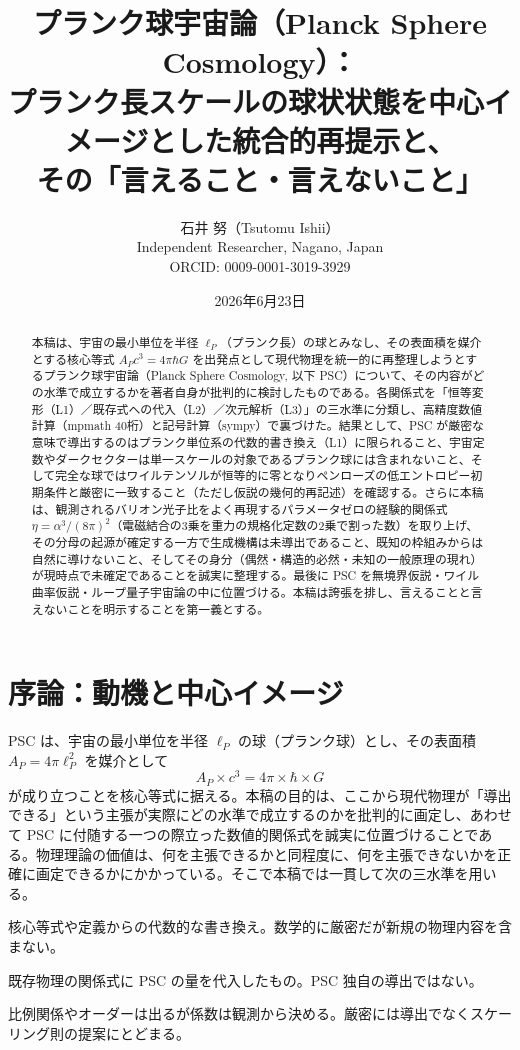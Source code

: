 \documentclass[11pt,a4paper]{article}
\title{\bfseries プランク球宇宙論（Planck Sphere Cosmology）：\\プランク長スケールの球状状態を中心イメージとした統合的再提示と、\\その「言えること・言えないこと」}
\author{石井 努（Tsutomu Ishii）\\ Independent Researcher, Nagano, Japan\\ ORCID: 0009-0001-3019-3929}
\date{2026年6月23日}
\newcommand{\eP}{\ell_P}
\begin{document}
\maketitle

\begin{abstract}
本稿は、宇宙の最小単位を半径 $\eP$（プランク長）の球とみなし、その表面積を媒介とする核心等式 $A_P c^3 = 4\pi\hbar G$ を出発点として現代物理を統一的に再整理しようとするプランク球宇宙論（Planck Sphere Cosmology, 以下 PSC）について、その内容がどの水準で成立するかを著者自身が批判的に検討したものである。各関係式を「恒等変形（L1）／既存式への代入（L2）／次元解析（L3）」の三水準に分類し、高精度数値計算（mpmath 40桁）と記号計算（sympy）で裏づけた。結果として、PSC が厳密な意味で導出するのはプランク単位系の代数的書き換え（L1）に限られること、宇宙定数やダークセクターは単一スケールの対象であるプランク球には含まれないこと、そして完全な球ではワイルテンソルが恒等的に零となりペンローズの低エントロピー初期条件と厳密に一致すること（ただし仮説の幾何的再記述）を確認する。さらに本稿は、観測されるバリオン光子比をよく再現するパラメータゼロの経験的関係式 $\eta = \alpha^3/(8\pi)^2$（電磁結合の3乗を重力の規格化定数の2乗で割った数）を取り上げ、その分母の起源が確定する一方で生成機構は未導出であること、既知の枠組みからは自然に導けないこと、そしてその身分（偶然・構造的必然・未知の一般原理の現れ）が現時点で未確定であることを誠実に整理する。最後に PSC を無境界仮説・ワイル曲率仮説・ループ量子宇宙論の中に位置づける。本稿は誇張を排し、言えることと言えないことを明示することを第一義とする。
\end{abstract}

\section{序論：動機と中心イメージ}
PSC は、宇宙の最小単位を半径 $\eP$ の球（プランク球）とし、その表面積 $A_P = 4\pi\eP^2$ を媒介として
\begin{equation}
A_P \times c^3 = 4\pi \times \hbar \times G
\label{eq:core}
\end{equation}
が成り立つことを核心等式に据える。本稿の目的は、ここから現代物理が「導出できる」という主張が実際にどの水準で成立するのかを批判的に画定し、あわせて PSC に付随する一つの際立った数値的関係式を誠実に位置づけることである。物理理論の価値は、何を主張できるかと同程度に、何を主張できないかを正確に画定できるかにかかっている。そこで本稿では一貫して次の三水準を用いる。

\begin{description}[leftmargin=2.2em,style=nextline]
\item[L1（恒等変形）] 核心等式や定義からの代数的な書き換え。数学的に厳密だが新規の物理内容を含まない。
\item[L2（既存式への代入）] 既存物理の関係式に PSC の量を代入したもの。PSC 独自の導出ではない。
\item[L3（次元解析＋係数の後付け）] 比例関係やオーダーは出るが係数は観測から決める。厳密には導出でなくスケーリング則の提案にとどまる。
\end{description}
\end{document}
